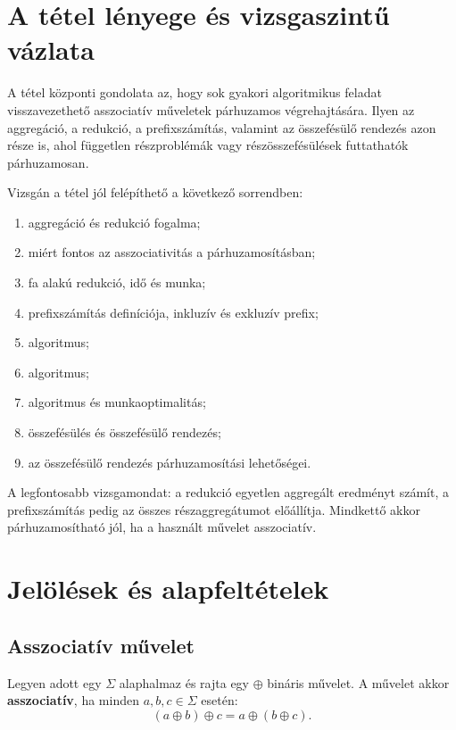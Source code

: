 \section{A tétel lényege és vizsgaszintű vázlata}

\begin{summarybox}
A tétel központi gondolata az, hogy sok gyakori algoritmikus feladat visszavezethető asszociatív műveletek párhuzamos végrehajtására. Ilyen az aggregáció, a redukció, a prefixszámítás, valamint az összefésülő rendezés azon része is, ahol független részproblémák vagy részösszefésülések futtathatók párhuzamosan.
\end{summarybox}

Vizsgán a tétel jól felépíthető a következő sorrendben:

\begin{enumerate}
  \item aggregáció és redukció fogalma;
  \item miért fontos az asszociativitás a párhuzamosításban;
  \item fa alakú redukció, idő és munka;
  \item prefixszámítás definíciója, inkluzív és exkluzív prefix;
  \item {} algoritmus;
  \item {} algoritmus;
  \item {} algoritmus és munkaoptimalitás;
  \item összefésülés és összefésülő rendezés;
  \item az összefésülő rendezés párhuzamosítási lehetőségei.
\end{enumerate}

A legfontosabb vizsgamondat: a redukció egyetlen aggregált eredményt számít, a prefixszámítás pedig az összes részaggregátumot előállítja. Mindkettő akkor párhuzamosítható jól, ha a használt művelet asszociatív.

\section{Jelölések és alapfeltételek}

\subsection{Asszociatív művelet}

Legyen adott egy $\Sigma$ alaphalmaz és rajta egy $\oplus$ bináris művelet. A művelet akkor \textbf{asszociatív}, ha minden $a,b,c\in\Sigma$ esetén:
\[
  (a\oplus b)\oplus c = a\oplus (b\oplus c).
\]


